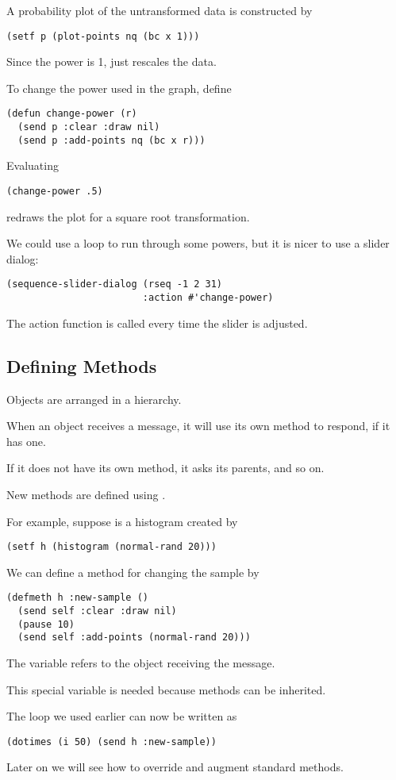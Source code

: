 \begin{slide}{}
A probability plot of the untransformed data is constructed by
\begin{verbatim}
(setf p (plot-points nq (bc x 1)))
\end{verbatim}
Since the power is 1,  just rescales the data.

To change the power used in the graph, define
\begin{verbatim}
(defun change-power (r)
  (send p :clear :draw nil)
  (send p :add-points nq (bc x r)))
\end{verbatim}
Evaluating 
\begin{verbatim}
(change-power .5)
\end{verbatim}
redraws the plot for a square root transformation.

We could use a loop to run through some powers, but it is nicer to use
a slider dialog:
{\Large
\begin{verbatim}
(sequence-slider-dialog (rseq -1 2 31)
                        :action #'change-power)
\end{verbatim}}
The action function  is called every time the
slider is adjusted.
\end{slide}

\begin{slide}{}
\subsection{Defining Methods}
Objects are arranged in a hierarchy.

When an object receives a message, it will use its own method
to respond, if it has one.

If it does not have its own method, it asks its parents, and so on.

New methods are defined using .
\end{slide}

\begin{slide}{}
For example, suppose  is a histogram created by
{\Large
\begin{verbatim}
(setf h (histogram (normal-rand 20)))
\end{verbatim}}
We can define a method for changing the sample by
{\Large
\begin{verbatim}
(defmeth h :new-sample ()
  (send self :clear :draw nil)
  (pause 10)
  (send self :add-points (normal-rand 20)))
\end{verbatim}}
The variable  refers to the object receiving the message.

This special variable is needed because methods can be inherited.

The loop we used earlier can now be written as
{\Large
\begin{verbatim}
(dotimes (i 50) (send h :new-sample))
\end{verbatim}}

Later on we will see how to override and augment standard methods.
\end{slide}

